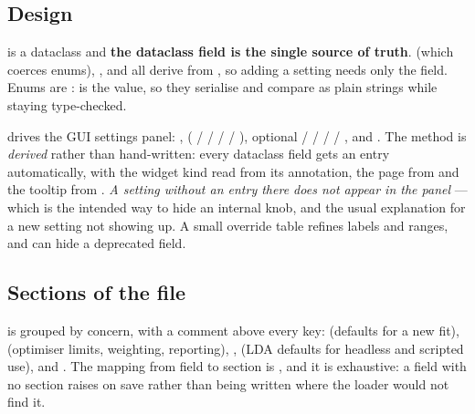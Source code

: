 \subsection{Design}

 is a dataclass and \textbf{the dataclass field is the single
source of truth}.  (which coerces enums),
,  and  all derive from
, so adding a setting needs only the field. Enums are
:  is the value, so they serialise and
compare as plain strings while staying type-checked.

 drives the GUI settings panel: ,
 ( /  /  /  /
), optional  /  /  /
 / , and . The method is \emph{derived}
rather than hand-written: every dataclass field gets an entry automatically,
with the widget kind read from its annotation, the page from
 and the tooltip from .
\emph{A setting without an entry there does not appear in the panel} ---
which is the intended way to hide an internal knob, and the usual explanation
for a new setting not showing up. A small override table refines labels and
ranges, and can hide a deprecated field.

\subsection{Sections of the file}

 is grouped by concern, with a comment above every key:
\code{[fit]} (defaults for a new fit), \code{[solver]} (optimiser limits,
weighting, reporting), \code{[irf]}, \code{[lda]} (LDA defaults for headless
and scripted use), \code{[gui]} and \code{[paths]}. The mapping from field to
section is , and it is exhaustive: a field
with no section raises on save rather than being written where the loader would
not find it.

